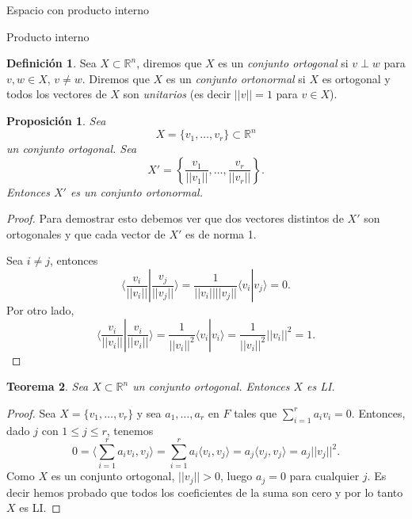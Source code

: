 \documentclass[a4paper,12pt,twoside,spanish,reqno]{amsbook}
\newtheorem{teorema}{Teorema}[section]
\newtheorem{proposicion}[teorema]{Proposici\'on}
\theoremstyle{definition}
\newtheorem{definicion}{Definici\'on}[section]
\theoremstyle{remark}
\newcommand{\la}{\langle}
\newcommand{\ra}{\rangle}
\newcommand{\R}{\mathbb R}
\begin{document}
\begin{chapter}{Espacio con producto interno}
\begin{section}{Producto interno}
		\begin{definicion} Sea $X \subset \R^n$, diremos que $X$ es un \emph{conjunto ortogonal} si $v\perp w$ para $v,w \in X$, $v\not= w$. Diremos que $X$ es un \emph{conjunto ortonormal} si $X$ es ortogonal y todos los vectores de $X$ son  \textit{unitarios} (es decir $||v|| =1$ para $v \in X$).
		\end{definicion}
	
		
		\begin{proposicion}\label{ortogonal->ortonormal}
			Sea  $$X = \{v_1,\ldots,v_r \} \subset \R^n$$ un conjunto ortogonal. Sea 
			\begin{equation*}
				X' =  \left\{\frac{v_1}{||v_1||},\ldots,\frac{v_r}{||v_r||} \right\}.
			\end{equation*}
			Entonces $X'$ es  un conjunto ortonormal. 
		\end{proposicion}
		\begin{proof}
			Para demostrar esto debemos ver que dos vectores distintos de $X'$ son ortogonales y que cada vector de $X'$ es de norma 1.
			
			Sea $i \ne j$, entonces
			\begin{equation*}
			\la \frac{v_i}{||v_i||} | \frac{v_j}{||v_j||}\ra = \frac{1}{||v_i||||v_j||} \la v_i | v_j\ra = 0.
			\end{equation*}
			Por otro lado,
			\begin{equation*}
			\la \frac{v_i}{||v_i||} | \frac{v_i}{||v_i||}\ra = \frac{1}{||v_i||^2} \la v_i | v_i\ra=  \frac{1}{||v_i||^2}||v_i||^2 =1.
			\end{equation*}
		\end{proof}	
			
			
			
		
		
		\medskip
		
		\begin{teorema}\label{th-ortogonal-implica-li} Sea $X \subset \R^n$ un conjunto  ortogonal. Entonces $X$ es LI. 
		\end{teorema}
		\begin{proof} Sea $X =\{v_1,\ldots,v_r \}$ y sea $a_1,\ldots,a_r$ en $F$ tales que  $\sum_{i=1}^r a_iv_i =0$. Entonces,  dado $j$ con $1 \le j \le r$,  tenemos 
			$$
			0=\la\sum_{i=1}^r a_iv_i ,v_j \ra = \sum_{i=1}^r a_i\la v_i ,v_j \ra = a_j\la v_j ,v_j \ra = a_j||v_j||^2.
			$$
			Como $X$  es un conjunto ortogonal,  $||v_j|| >0$, luego $a_j =0$ para cualquier $j$. Es decir hemos probado que todos los coeficientes de la suma son cero y por lo tanto $X$  es LI.
		\end{proof}
		

\end{section}
\end{chapter}
\end{document}
